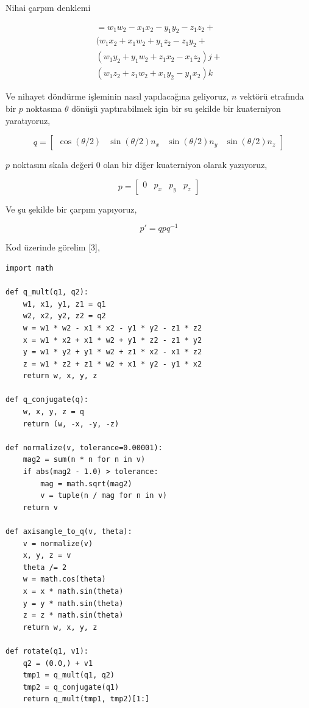 \documentclass[12pt,fleqn]{article}\usepackage{../../common}
\begin{document}
Nihai çarpım denklemi

\begin{align*}
= w_1 w_2 - x_1 x_2 - y_1 y_2 - z_1 z_2 + \\
(w_1 x_2 + x_1 w_2 + y_1 z_2 - z_1 y_2 + \\
(w_1 y_2 + y_1 w_2 + z_1 x_2 - x_1 z_2) j + \\
(w_1 z_2 + z_1 w_2 + x_1 y_2 - y_1 x_2) k
\end{align*}

Ve nihayet döndürme işleminin nasıl yapılacağına geliyoruz, $n$ vektörü
etrafında bir $p$ noktasına $\theta$ dönüşü yaptırabilmek için bir su şekilde
bir kuaterniyon yaratıyoruz,

$$
q = [\begin{array}{cccc}
    \cos(\theta/2) &
    \sin(\theta/2) n_x &
    \sin(\theta/2) n_y &
    \sin(\theta/2) n_z \end{array}]
$$

$p$ noktasını skala değeri 0 olan bir diğer kuaterniyon olarak yazıyoruz,

$$
p = [\begin{array}{cccc} 0 & p_x & p_y & p_z \end{array}]
$$

Ve şu şekilde bir çarpım yapıyoruz,

$$
p' = q p q^{-1}
$$

Kod üzerinde görelim [3],

\begin{verbatim}
import math

def q_mult(q1, q2):
    w1, x1, y1, z1 = q1
    w2, x2, y2, z2 = q2
    w = w1 * w2 - x1 * x2 - y1 * y2 - z1 * z2
    x = w1 * x2 + x1 * w2 + y1 * z2 - z1 * y2
    y = w1 * y2 + y1 * w2 + z1 * x2 - x1 * z2
    z = w1 * z2 + z1 * w2 + x1 * y2 - y1 * x2
    return w, x, y, z

def q_conjugate(q):
    w, x, y, z = q
    return (w, -x, -y, -z)

def normalize(v, tolerance=0.00001):
    mag2 = sum(n * n for n in v)
    if abs(mag2 - 1.0) > tolerance:
        mag = math.sqrt(mag2)
        v = tuple(n / mag for n in v)
    return v

def axisangle_to_q(v, theta):
    v = normalize(v)
    x, y, z = v
    theta /= 2
    w = math.cos(theta)
    x = x * math.sin(theta)
    y = y * math.sin(theta)
    z = z * math.sin(theta)
    return w, x, y, z

def rotate(q1, v1):
    q2 = (0.0,) + v1
    tmp1 = q_mult(q1, q2)
    tmp2 = q_conjugate(q1)
    return q_mult(tmp1, tmp2)[1:]
    
\end{verbatim}
\end{document}
